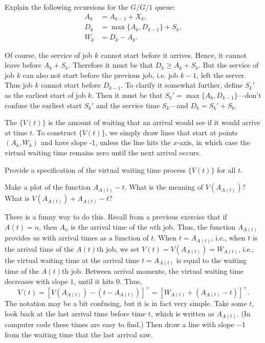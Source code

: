 \begin{exercise} 
Explain the following recursions for the $G/G/1$ queue:
\begin{equation}
 \label{eq:45}
 \begin{split}
 A_k &= A_{k-1} + X_k, \\
 D_k &= \max\{A_k, D_{k-1}\} + S_k,\\
 W_k &= D_k - A_k.
 \end{split}
\end{equation}

\begin{solution}
 Of course, the service of job $k$ cannot start before it arrives.
 Hence, it cannot leave before $A_k + S_k$.
 Therefore it must be that $D_k \geq A_k +S_k$.
 But the service of job $k$ can also not start before the previous job, i.e.
 job $k-1$, left the server.
 Thus job $k$ cannot start before $D_{k-1}$.
 To clarify it somewhat further, define $S_k'$ as the earliest start of job $k$.
 Then it must be that $S_k' = \max\{A_k, D_{k-1}\}$---don't confuse the earliest start $S_k'$ and the service time $S_k$---and $D_k = S_k' + S_k$.
\end{solution}
\end{exercise}

The  $\{V(t)\}$ is the amount of waiting that an arrival would see if it would arrive at time $t$.
To construct $\{V(t)\}$, we simply draw lines that start at points $(A_k, W_k)$ and have slope -1, unless the line hits the $x$-axis, in which case the virtual waiting time remains zero until the next arrival occurs.


\begin{exercise}
 Provide a specification of the virtual waiting time process $\{V(t)\}$ for
 all $t$.
\begin{hint}Make a plot of the function $A_{A(t)}-t$. What is the meaning of $V(A_{A(t)})?$ What is
$V(A_{A(t)}) + A_{A(t)}-t$?
\end{hint}
\begin{solution}
 There is a funny way to do this.
 Recall from a previous exercise that if $A(t)=n$, then $A_n$ is the arrival time of the $n$th job.
 Thus, the function $A_{A(t)}$ provides us with arrival times as a function of $t$.
 When $t=A_{A(t)}$, i.e., when $t$ is the arrival time of the $A(t)$th job, we set $V(t) = V(A_{A(t)}) = W_{A(t)}$, i.e., the virtual waiting time at the arrival time $t=A_{A(t)}$ is equal to the waiting time of the $A(t)$th job.
 Between arrival moments, the virtual waiting time decreases with slope $1$, until it hits 0.
 Thus,
 \begin{equation*}
 V(t) 
= [V(A_{A(t)}) - (t-A_{A(t)})]^+= [W_{A(t)} + (A_{A(t)}-t)]^+.
 \end{equation*}
 The notation may be a bit confusing, but it is in fact very simple.
 Take some $t$, look back at the last arrival time before time $t$, which is written as $A_{A(t)}$.
 (In computer code these times are easy to find.)
 Then draw a line with slope $-1$ from the waiting time that the last arrival saw.
\end{solution}
\end{exercise}

